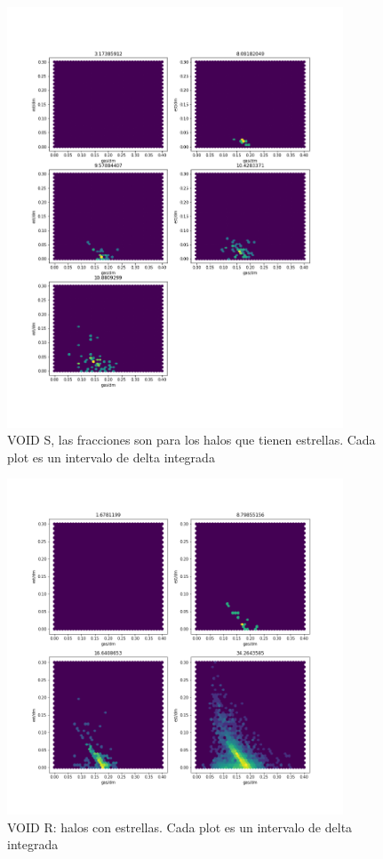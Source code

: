 \begin{figure}[h]
\centering
\includegraphics[width=10cm]{Figures/fraccionesDelta_S.png}
\decoRule
\caption[asd]{VOID S, las fracciones son para los halos que tienen estrellas. Cada plot es un intervalo de delta integrada }
\label{fig:Electron}
\end{figure}

\begin{figure}[h]
\centering
\includegraphics[width=10cm]{Figures/fraccionesDelta_R.png}
\decoRule
\caption[asd]{VOID R: halos con estrellas. Cada plot es un intervalo de delta integrada }
\label{fig:Electron}
\end{figure}

